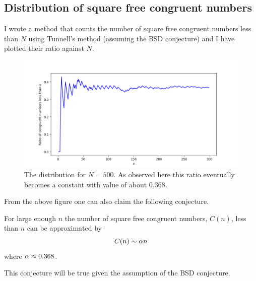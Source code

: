 \subsection{Distribution of square free congruent numbers}
I wrote a method that counts the number of square free congruent numbers less than $N$ using Tunnell's method (assuming the BSD conjecture) and I have plotted their ratio against $N$.

\begin{figure}
  \includegraphics[width = \textwidth]{code/distribution2.png}
  \caption{The distribution for $N = 500$. As observed here this ratio eventually becomes a constant with value of about $0.368$.}
\end{figure}
From the above figure one can also claim the following conjecture.
\begin{conjecture}
  For large enough $n$ the number of square free congruent numbers, $C(n)$, less than $n$ can be approximated by
  \begin{align*}
    C(n) \sim \alpha n
  \end{align*}
  where $\alpha \approx 0.368$.
\end{conjecture}
This conjecture will be true given the assumption of the BSD conjecture.
